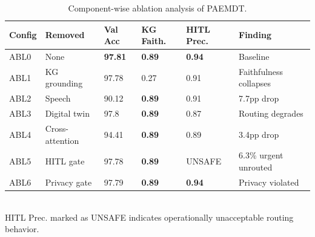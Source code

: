 \begin{table}[t]
\centering
\caption{Component-wise ablation analysis of PAEMDT.}
\label{tab:paemdt_table5}
\small
\begin{tabular}{llllll}
\toprule
Config & Removed & Val Acc & KG Faith. & HITL Prec. & Finding \\
\midrule
ABL0 & None & \textbf{97.81} & \textbf{0.89} & \textbf{0.94} & Baseline \\
ABL1 & KG grounding & 97.78 & 0.27 & 0.91 & Faithfulness collapses \\
ABL2 & Speech & 90.12 & \textbf{0.89} & 0.91 & 7.7pp drop \\
ABL3 & Digital twin & 97.8 & \textbf{0.89} & 0.87 & Routing degrades \\
ABL4 & Cross-attention & 94.41 & \textbf{0.89} & 0.89 & 3.4pp drop \\
ABL5 & HITL gate & 97.78 & \textbf{0.89} & UNSAFE & 6.3\% urgent unrouted \\
ABL6 & Privacy gate & 97.79 & \textbf{0.89} & \textbf{0.94} & Privacy violated \\
\bottomrule
\end{tabular}
\\[2pt]\footnotesize{HITL Prec. marked as UNSAFE indicates operationally unacceptable routing behavior.}
\end{table}
